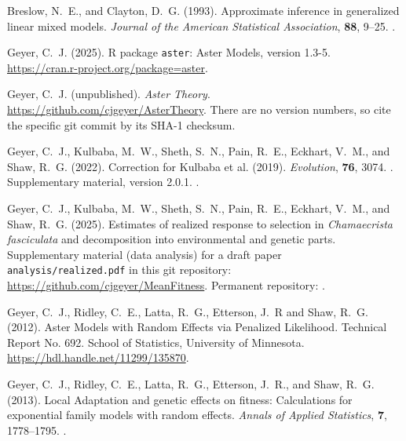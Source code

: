 \documentclass[11pt]{article}
\let\code=\texttt
\begin{document}
\begin{thebibliography}{}

Breslow, N.~E., and Clayton, D.~G. (1993).
\newblock Approximate inference in generalized linear mixed models.
\newblock \emph{Journal of the American Statistical Association},
    \textbf{88}, 9--25.
\newblock {}.

Geyer, C.~J. (2025).
\newblock R package \texttt{aster}: Aster Models, version 1.3-5.
\newblock \url{https://cran.r-project.org/package=aster}.

Geyer, C.~J. (unpublished).
\newblock \emph{Aster Theory}.
\newblock \url{https://github.com/cjgeyer/AsterTheory}.
\newblock There are no version numbers, so cite the specific git
    commit by its SHA-1 checksum.

Geyer, C.~J., Kulbaba, M.~W., Sheth, S.~N., Pain, R.~E., Eckhart, V.~M.,
    and Shaw, R.~G. (2022).
\newblock Correction for Kulbaba et al. (2019).
\newblock \emph{Evolution}, \textbf{76}, 3074.
\newblock {}.
\newblock Supplementary material, version 2.0.1.
\newblock {}.

Geyer, C.~J., Kulbaba, M.~W., Sheth, S.~N., Pain, R.~E., Eckhart, V.~M.,
    and Shaw, R.~G. (2025).
\newblock Estimates of realized response to selection in \emph{Chamaecrista
    fasciculata} and decomposition into environmental and genetic parts.
\newblock Supplementary material (data analysis) for a draft paper
    \code{analysis/realized.pdf} in this git repository:
\newblock \url{https://github.com/cjgeyer/MeanFitness}.
\newblock Permanent repository: .

Geyer, C.~J., Ridley, C.~E., Latta, R.~G., Etterson, J.~R and Shaw, R.~G.
    (2012).
\newblock Aster Models with Random Effects via Penalized Likelihood.
\newblock Technical Report No. 692.  School of Statistics,
    University of Minnesota.
\newblock \url{https://hdl.handle.net/11299/135870}.

Geyer, C.~J., Ridley, C.~E., Latta, R.~G., Etterson, J.~R., and Shaw, R.~G.
    (2013).
\newblock Local Adaptation and genetic effects on fitness: Calculations for
    exponential family models with random effects.
\newblock \emph{Annals of Applied Statistics}, \textbf{7}, 1778--1795.
\newblock {}.


\end{thebibliography}
\end{document}
